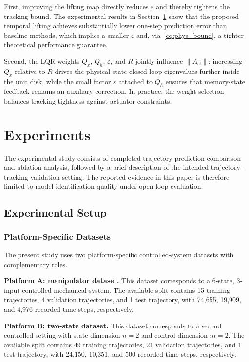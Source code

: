 \documentclass[journal]{IEEEtran}
\begin{document}
First, improving the lifting map directly reduces $\varepsilon$ and thereby tightens the tracking bound. The experimental results in Section~\ref{sec:experiments} show that the proposed temporal lifting achieves substantially lower one-step prediction error than baseline methods, which implies a smaller $\varepsilon$ and, via~\eqref{eq:phys_bound}, a tighter theoretical performance guarantee.

Second, the LQR weights $Q_x$, $Q_h$, $\varepsilon$, and $R$ jointly influence $\|A_{\mathrm{cl}}\|$: increasing $Q_x$ relative to $R$ drives the physical-state closed-loop eigenvalues further inside the unit disk, while the small factor $\varepsilon$ attached to $Q_h$ ensures that memory-state feedback remains an auxiliary correction. In practice, the weight selection balances tracking tightness against actuator constraints.

\section{Experiments}
\label{sec:experiments}

The experimental study consists of completed trajectory-prediction comparison and ablation analysis, followed by a brief description of the intended trajectory-tracking validation setting. The reported evidence in this paper is therefore limited to model-identification quality under open-loop evaluation.

\subsection{Experimental Setup}

\subsubsection{Platform-Specific Datasets}

The present study uses two platform-specific controlled-system datasets with complementary roles.

\textbf{Platform A: manipulator dataset.} This dataset corresponds to a 6-state, 3-input controlled mechanical system. The available split contains 15 training trajectories, 4 validation trajectories, and 1 test trajectory, with 74,655, 19,909, and 4,976 recorded time steps, respectively.

\textbf{Platform B: two-state dataset.} This dataset corresponds to a second controlled setting with state dimension $n=2$ and control dimension $m=2$. The available split contains 49 training trajectories, 21 validation trajectories, and 1 test trajectory, with 24,150, 10,351, and 500 recorded time steps, respectively.
\end{document}

